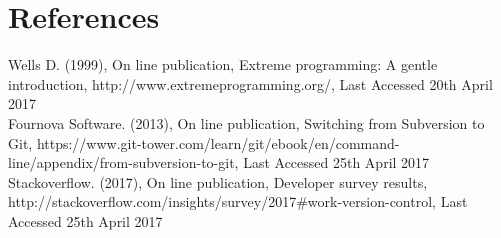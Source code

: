 %
%
%
%
%
%

\section*{References}
\label{sec:references}

\begin{thebibliography}{0}


Wells D. (1999), On line publication, Extreme programming: A gentle introduction, http://www.extremeprogramming.org/, Last Accessed 20th April 2017
\\
Fournova Software. (2013), On line publication, Switching from Subversion to Git, https://www.git-tower.com/learn/git/ebook/en/command-line/appendix/from-subversion-to-git, Last Accessed 25th April 2017
\\
Stackoverflow. (2017), On line publication, Developer survey results, http://stackoverflow.com/insights/survey/2017\#work-version-control, Last Accessed 25th April 2017

\end{thebibliography}